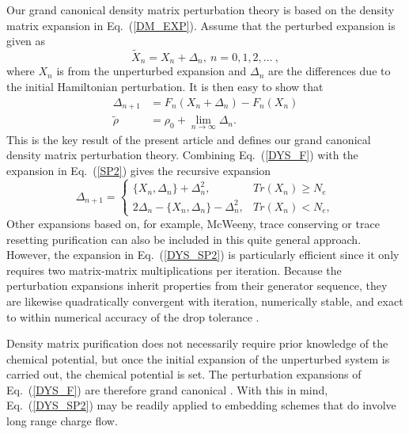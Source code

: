 Our grand canonical density matrix perturbation theory is based on 
the density matrix expansion in Eq.\ (\ref{DM_EXP}).
Assume that the perturbed expansion is given as
\begin{equation}\label{dX}
{\widetilde X_n} = X_n + \Delta_n, ~ n = 0,1,2,\ldots~,
\end{equation}
where $X_n$ is from the unperturbed expansion 
and $\Delta_n$ are the differences due to the initial Hamiltonian
perturbation. It is then easy to show that 
\begin{equation}\label{DYS_F}\begin{array}{ll}
\Delta_{n+1} &= F_n(X_n + \Delta_n) - F_n(X_n)\\
{\widetilde \rho} &= \rho_0 + \lim_{n \rightarrow \infty} \Delta_n. \end{array}
\end{equation}
This is the key result of the present
article and defines our grand canonical density matrix perturbation theory.
Combining Eq.\ (\ref{DYS_F}) with the expansion in Eq.\ (\ref{SP2}) gives 
the recursive expansion \cite{Notation}
\begin{equation} \label{DYS_SP2}
\Delta_{n+1} = 
\left\{\begin{array}{ll}
\{ X_n,\Delta_n\} + \Delta_n^2, &  Tr(X_n) \geq N_e \\
2\Delta_n - \{ X_n,\Delta_n\} - \Delta_n^2, & Tr( X_n) < N_e,
\end{array} \right.
\end{equation}
Other expansions based on, for example, McWeeny, trace conserving or 
trace resetting purification \cite{McWeeny60,Palser98,NiklassonSP4}
can also be included in this quite general approach. However, the 
expansion in Eq.\ (\ref{DYS_SP2}) is particularly efficient since it only 
requires two matrix-matrix multiplications per iteration.
Because the perturbation expansions inherit properties from their 
generator sequence, they are likewise quadratically convergent with 
iteration, numerically stable, and exact to within numerical accuracy 
of the drop tolerance \cite{NiklassonSP4}.

Density matrix purification does not necessarily require
prior knowledge of the chemical potential, but once the
initial expansion of the unperturbed system is carried out, the
chemical potential is set. The perturbation expansions of 
Eq.\ (\ref{DYS_F}) are therefore grand canonical \cite{CPRT}.
With this in mind, Eq.~(\ref{DYS_SP2}) may be readily applied 
to embedding schemes that do involve long range charge flow.

